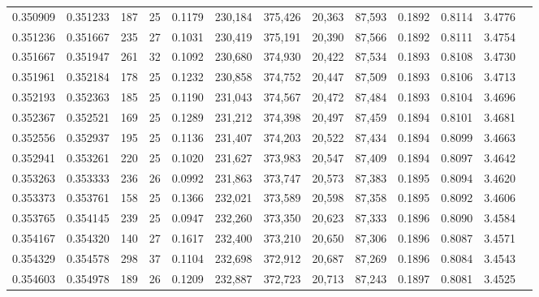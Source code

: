 \begin{tabular}{rrrrrrrrrrrrr}
0.350909 & 0.351233 &    187 &    25 &                                     0.1179 & 230,184 & 375,426 &  20,363 &  87,593 & 0.1892 & 0.8114 & 3.4776 \\
0.351236 & 0.351667 &    235 &    27 &                                     0.1031 & 230,419 & 375,191 &  20,390 &  87,566 & 0.1892 & 0.8111 & 3.4754 \\
0.351667 & 0.351947 &    261 &    32 &                                     0.1092 & 230,680 & 374,930 &  20,422 &  87,534 & 0.1893 & 0.8108 & 3.4730 \\
0.351961 & 0.352184 &    178 &    25 &                                     0.1232 & 230,858 & 374,752 &  20,447 &  87,509 & 0.1893 & 0.8106 & 3.4713 \\
0.352193 & 0.352363 &    185 &    25 &                                     0.1190 & 231,043 & 374,567 &  20,472 &  87,484 & 0.1893 & 0.8104 & 3.4696 \\
0.352367 & 0.352521 &    169 &    25 &                                     0.1289 & 231,212 & 374,398 &  20,497 &  87,459 & 0.1894 & 0.8101 & 3.4681 \\
0.352556 & 0.352937 &    195 &    25 &                                     0.1136 & 231,407 & 374,203 &  20,522 &  87,434 & 0.1894 & 0.8099 & 3.4663 \\
0.352941 & 0.353261 &    220 &    25 &                                     0.1020 & 231,627 & 373,983 &  20,547 &  87,409 & 0.1894 & 0.8097 & 3.4642 \\
0.353263 & 0.353333 &    236 &    26 &                                     0.0992 & 231,863 & 373,747 &  20,573 &  87,383 & 0.1895 & 0.8094 & 3.4620 \\
0.353373 & 0.353761 &    158 &    25 &                                     0.1366 & 232,021 & 373,589 &  20,598 &  87,358 & 0.1895 & 0.8092 & 3.4606 \\
0.353765 & 0.354145 &    239 &    25 &                                     0.0947 & 232,260 & 373,350 &  20,623 &  87,333 & 0.1896 & 0.8090 & 3.4584 \\
0.354167 & 0.354320 &    140 &    27 &                                     0.1617 & 232,400 & 373,210 &  20,650 &  87,306 & 0.1896 & 0.8087 & 3.4571 \\
0.354329 & 0.354578 &    298 &    37 &                                     0.1104 & 232,698 & 372,912 &  20,687 &  87,269 & 0.1896 & 0.8084 & 3.4543 \\
0.354603 & 0.354978 &    189 &    26 &                                     0.1209 & 232,887 & 372,723 &  20,713 &  87,243 & 0.1897 & 0.8081 & 3.4525 \\

\end{tabular}
